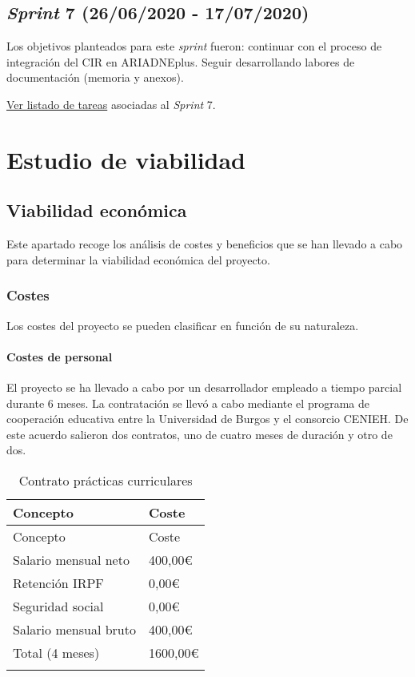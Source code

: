 \subsection{\emph{Sprint} 7 (26/06/2020 - 17/07/2020)}
Los objetivos planteados para este \emph{sprint} fueron: continuar con
el proceso de integración del CIR en ARIADNEplus. Seguir desarrollando
labores de documentación (memoria y anexos).

\href{https://github.com/gcm1001/TFG-CeniehAriadne/milestone/8}{Ver
listado de tareas} asociadas al \emph{Sprint} 7.

\section{Estudio de viabilidad}

\subsection{Viabilidad económica}

Este apartado recoge los análisis de costes y beneficios que se han
llevado a cabo para determinar la viabilidad económica del proyecto.

\subsubsection{Costes}

Los costes del proyecto se pueden clasificar en función de su
naturaleza.

\paragraph{Costes de personal}

El proyecto se ha llevado a cabo por un desarrollador empleado a tiempo
parcial durante 6 meses. La contratación se llevó a cabo mediante el
programa de cooperación educativa entre la Universidad de Burgos y el
consorcio CENIEH. De este acuerdo salieron dos contratos, uno de cuatro
meses de duración y otro de dos.

\begin{longtable}[]{@{}ll@{}}
\toprule
Concepto & Coste\tabularnewline
\midrule
\endfirsthead
\toprule
Concepto & Coste\tabularnewline
\midrule
\endhead
Salario mensual neto & 400,00\euro{}\tabularnewline
Retención IRPF & 0,00\euro{}\tabularnewline
Seguridad social & 0,00\euro{}\tabularnewline
Salario mensual bruto & 400,00\euro{}\tabularnewline
Total (4 meses) & 1600,00\euro{}\tabularnewline
\bottomrule
\caption{Contrato prácticas curriculares}
\end{longtable}

